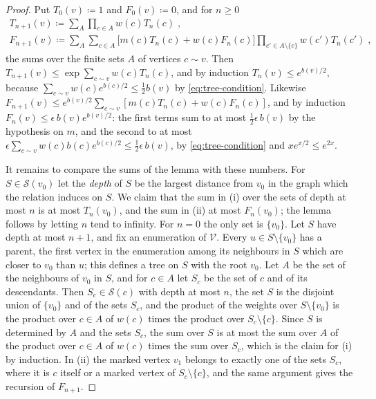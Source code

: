 \documentclass[11pt]{preprint}
\numberwithin{equation}{section}
\theoremstyle{definition}
\theoremstyle{remark}
\theoremstyle{plain}
\begin{document}
\begin{proof}
Put $T_0(v) \coloneqq 1$ and $F_0(v) \coloneqq 0$, and for $n \geq 0$
\begin{gather*}
    T_{n+1}(v) \coloneqq \sum_A\prod_{c \in A}w(c)T_n(c)\;,\\
    F_{n+1}(v) \coloneqq \sum_A\sum_{c \in A}\bigl[m(c)T_n(c) + w(c)F_n(c)\bigr]\prod_{c' \in A \setminus \{ c \}}w(c')T_n(c')\;,
\end{gather*}
the sums over the finite sets $A$ of vertices $c \sim v$. Then $T_{n+1}(v) \leq \exp\sum_{c \sim v}w(c)T_n(c)$, and by induction $T_n(v) \leq e^{b(v)/2}$, because $\sum_{c \sim v}w(c)e^{b(c)/2} \leq \frac12b(v)$ by \eqref{eq:tree-condition}. Likewise $F_{n+1}(v) \leq e^{b(v)/2}\sum_{c \sim v}[m(c)T_n(c) + w(c)F_n(c)]$, and by induction $F_n(v) \leq \epsilon\,b(v)e^{b(v)/2}$: the first terms sum to at most $\frac12\epsilon\,b(v)$ by the hypothesis on $m$, and the second to at most $\epsilon\sum_{c \sim v}w(c)b(c)e^{b(c)/2} \leq \frac12\epsilon\,b(v)$, by \eqref{eq:tree-condition} and $xe^{x/2} \leq e^{2x}$.

It remains to compare the sums of the lemma with these numbers. For $S \in \mathcal S(v_0)$ let the \emph{depth} of $S$ be the largest distance from $v_0$ in the graph which the relation induces on $S$. We claim that the sum in (i) over the sets of depth at most $n$ is at most $T_n(v_0)$, and the sum in (ii) at most $F_n(v_0)$; the lemma follows by letting $n$ tend to infinity. For $n = 0$ the only set is $\{ v_0 \}$. Let $S$ have depth at most $n + 1$, and fix an enumeration of $\mathcal V$. Every $u \in S \setminus \{ v_0 \}$ has a parent, the first vertex in the enumeration among its neighbours in $S$ which are closer to $v_0$ than $u$; this defines a tree on $S$ with the root $v_0$. Let $A$ be the set of the neighbours of $v_0$ in $S$, and for $c \in A$ let $S_c$ be the set of $c$ and of its descendants. Then $S_c \in \mathcal S(c)$ with depth at most $n$, the set $S$ is the disjoint union of $\{ v_0 \}$ and of the sets $S_c$, and the product of the weights over $S \setminus \{ v_0 \}$ is the product over $c \in A$ of $w(c)$ times the product over $S_c \setminus \{ c \}$. Since $S$ is determined by $A$ and the sets $S_c$, the sum over $S$ is at most the sum over $A$ of the product over $c \in A$ of $w(c)$ times the sum over $S_c$, which is the claim for (i) by induction. In (ii) the marked vertex $v_1$ belongs to exactly one of the sets $S_c$, where it is $c$ itself or a marked vertex of $S_c \setminus \{ c \}$, and the same argument gives the recursion of $F_{n+1}$.
\end{proof}
\end{document}
